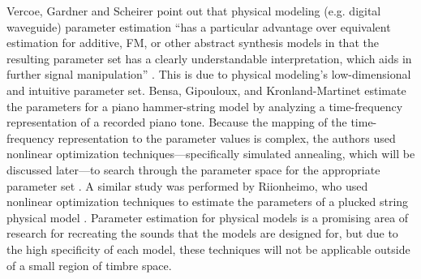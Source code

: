 \documentclass[a4paper,12pt]{report} 	%
\numberwithin{figure}{chapter}
\numberwithin{table}{chapter}
\numberwithin{equation}{chapter}
\begin{document}
\begin{flushleft}
Vercoe, Gardner and Scheirer point out that physical modeling (e.g. digital waveguide) parameter estimation ``has a particular advantage over equivalent estimation for additive, FM, or other abstract synthesis models in that the resulting parameter set has a clearly understandable interpretation, which aids in further signal manipulation'' \cite[p. 11]{Vercoe:1998hh}. This is due to physical modeling's low-dimensional and intuitive parameter set. Bensa, Gipouloux, and Kronland-Martinet estimate the parameters for a piano hammer-string model by analyzing a time-frequency representation of a recorded piano tone. Because the mapping of the time-frequency representation to the parameter values is complex, the authors used nonlinear optimization techniques---specifically simulated annealing, which will be discussed later---to search through the parameter space for the appropriate parameter set \cite[p. 499]{Bensa:2005xq}. A similar study was performed by Riionheimo, who used nonlinear optimization techniques to estimate the parameters of a plucked string physical model \cite{Riionheimo:2003qo}. Parameter estimation for physical models is a promising area of research for recreating the sounds that the models are designed for, but due to the high specificity of each model, these techniques will not be applicable outside of a small region of timbre space.


\end{flushleft}
\end{document}
